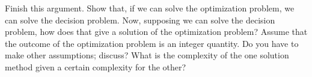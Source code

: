 Finish this argument. Show that, if we can solve the optimization
problem, we can solve the decision problem.
Now, supposing we can solve the decision problem, how
does that give a solution of the optimization problem? Assume that the
outcome of the optimization problem is an integer quantity. Do you
have to make other assumptions; discuss? What is
the complexity of the one solution method given a certain complexity
for the other?
